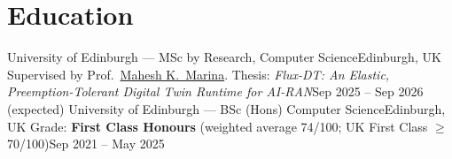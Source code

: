 \section{Education}
  \resumeSubHeadingListStart
    \resumeSubheading
      {University of Edinburgh --- MSc by Research, Computer Science}{Edinburgh, UK}
      {Supervised by Prof.\ \href{https://homepages.inf.ed.ac.uk/mmarina/}{Mahesh K.\ Marina}. Thesis: \textit{Flux-DT: An Elastic, Preemption-Tolerant Digital Twin Runtime for AI-RAN}}{Sep 2025 -- Sep 2026 (expected)}
    \resumeSubheading
      {University of Edinburgh --- BSc (Hons) Computer Science}{Edinburgh, UK}
      {Grade: \textbf{First Class Honours} (weighted average 74/100; UK First Class $\geq$ 70/100)}{Sep 2021 -- May 2025}
  \resumeSubHeadingListEnd
